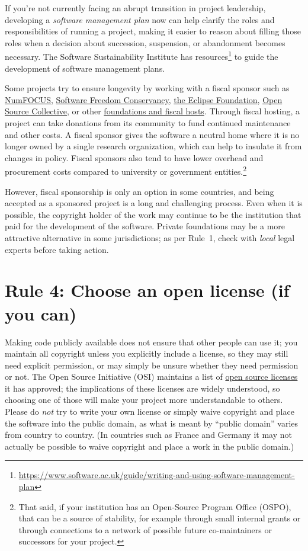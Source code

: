 \documentclass[10pt,letterpaper]{article}
\begin{document}
If you're not currently facing an abrupt transition in project leadership, developing a \emph{software management plan} now can help clarify the roles and responsibilities of running a project,
making it easier to reason about filling those roles when a decision about succession, suspension, or abandonment becomes necessary. The Software Sustainability Institute has resources\footnote{\url{https://www.software.ac.uk/guide/writing-and-using-software-management-plan}} to guide the development of software management plans.

Some projects try to ensure longevity by working with a fiscal sponsor such as
\href{https://numfocus.org/}{NumFOCUS},
\href{https://sfconservancy.org/}{Software Freedom Conservancy},
\href{https://www.eclipse.org/}{the Eclipse Foundation},
\href{https://oscollective.org/}{Open Source Collective},
or other \href{https://sustainoss.org/academic-map/organizations/}{foundations and fiscal hosts}.
Through fiscal hosting,
a project can take donations from its community to fund continued maintenance and other costs.
A fiscal sponsor gives the software a neutral home
where it is no longer owned by a single research organization,
which can help to insulate it from changes in policy.
Fiscal sponsors also tend to have lower overhead and procurement costs compared to
university or government entities.\footnote{That said, if your institution has an Open-Source Program Office (OSPO),
that can be a source of stability, for example through small internal grants or through
connections to a network of possible future co-maintainers or successors for your project.}

However,
fiscal sponsorship is only an option in some countries,
and being accepted as a sponsored project is a long and challenging process.
Even when it is possible,
the copyright holder of the work may continue to be the institution that paid for the development of the software.
Private foundations may be a more attractive alternative in some jurisdictions;
as per Rule~1,
check with \emph{local} legal experts before taking action.

\section*{Rule 4: Choose an open license (if you can)}

Making code publicly available does not ensure that other people can use it;
you maintain all copyright unless you explicitly include a license,
so they may still need explicit permission,
or may simply be unsure whether they need permission or not.
The Open Source Initiative (OSI)
maintains a list of \href{https://opensource.org/licenses}{open source licenses} it has approved;
the implications of these licenses are widely understood,
so choosing one of those will make your project more understandable to others.
Please do \emph{not} try to write your own license
or simply waive copyright and place the software into the public domain,
as what is meant by ``public domain'' varies from country to country.
(In countries such as France and Germany
it may not actually be possible to waive copyright and place a work in the public domain.)
\end{document}
